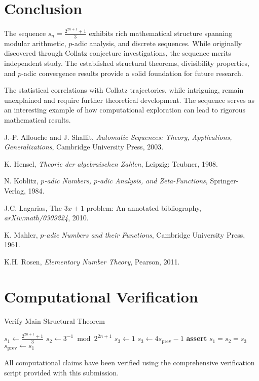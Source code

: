 \documentclass[11pt]{article}
\theoremstyle{definition}
\begin{document}
\section{Conclusion}

The sequence $s_n = \frac{2^{2n+1} + 1}{3}$ exhibits rich mathematical structure spanning modular arithmetic, $p$-adic analysis, and discrete sequences. While originally discovered through Collatz conjecture investigations, the sequence merits independent study. The established structural theorems, divisibility properties, and $p$-adic convergence results provide a solid foundation for future research.

The statistical correlations with Collatz trajectories, while intriguing, remain unexplained and require further theoretical development. The sequence serves as an interesting example of how computational exploration can lead to rigorous mathematical results.

\begin{thebibliography}{9}
J.-P. Allouche and J. Shallit, \emph{Automatic Sequences: Theory, Applications, Generalizations}, Cambridge University Press, 2003.

K. Hensel, \emph{Theorie der algebraischen Zahlen}, Leipzig: Teubner, 1908.

N. Koblitz, \emph{$p$-adic Numbers, $p$-adic Analysis, and Zeta-Functions}, Springer-Verlag, 1984.

J.C. Lagarias, The $3x+1$ problem: An annotated bibliography, \emph{arXiv:math/0309224}, 2010.

K. Mahler, \emph{$p$-adic Numbers and their Functions}, Cambridge University Press, 1961.

K.H. Rosen, \emph{Elementary Number Theory}, Pearson, 2011.
\end{thebibliography}

\appendix

\section{Computational Verification}

\begin{algorithm}
\caption{Verify Main Structural Theorem}
\begin{algorithmic}[1]
    \STATE $s_1 \leftarrow \frac{2^{2n+1} + 1}{3}$
    \STATE $s_2 \leftarrow 3^{-1} \bmod 2^{2n+1}$
        \STATE $s_3 \leftarrow 1$
    \ELSE
        \STATE $s_3 \leftarrow 4s_{\text{prev}} - 1$
    \ENDIF
    \STATE \textbf{assert} $s_1 = s_2 = s_3$
    \STATE $s_{\text{prev}} \leftarrow s_1$
\ENDFOR
\end{algorithmic}
\end{algorithm}

All computational claims have been verified using the comprehensive verification script provided with this submission.
\end{document}
